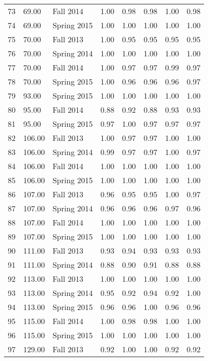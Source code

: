 \documentclass[12pt,]{article}
\begin{document}
\begin{longtable}{l|l|l|l|l|l|l|l}
  73 & 69.00 & Fall 2014 & 1.00 & 0.98 & 0.98 & 1.00 & 0.98 \\ 
  74 & 69.00 & Spring 2015 & 1.00 & 1.00 & 1.00 & 1.00 & 1.00 \\ 
  75 & 70.00 & Fall 2013 & 1.00 & 0.95 & 0.95 & 0.95 & 0.95 \\ 
  76 & 70.00 & Spring 2014 & 1.00 & 1.00 & 1.00 & 1.00 & 1.00 \\ 
  77 & 70.00 & Fall 2014 & 1.00 & 0.97 & 0.97 & 0.99 & 0.97 \\ 
  78 & 70.00 & Spring 2015 & 1.00 & 0.96 & 0.96 & 0.96 & 0.97 \\ 
  79 & 93.00 & Spring 2015 & 1.00 & 1.00 & 1.00 & 1.00 & 1.00 \\ 
  80 & 95.00 & Fall 2014 & 0.88 & 0.92 & 0.88 & 0.93 & 0.93 \\ 
  81 & 95.00 & Spring 2015 & 0.97 & 1.00 & 0.97 & 0.97 & 0.97 \\ 
  82 & 106.00 & Fall 2013 & 1.00 & 0.97 & 0.97 & 1.00 & 1.00 \\ 
  83 & 106.00 & Spring 2014 & 0.99 & 0.97 & 0.97 & 1.00 & 0.97 \\ 
  84 & 106.00 & Fall 2014 & 1.00 & 1.00 & 1.00 & 1.00 & 1.00 \\ 
  85 & 106.00 & Spring 2015 & 1.00 & 1.00 & 1.00 & 1.00 & 1.00 \\ 
  86 & 107.00 & Fall 2013 & 0.96 & 0.95 & 0.95 & 1.00 & 0.97 \\ 
  87 & 107.00 & Spring 2014 & 0.96 & 0.96 & 0.96 & 0.97 & 0.96 \\ 
  88 & 107.00 & Fall 2014 & 1.00 & 1.00 & 1.00 & 1.00 & 1.00 \\ 
  89 & 107.00 & Spring 2015 & 1.00 & 1.00 & 1.00 & 1.00 & 1.00 \\ 
  90 & 111.00 & Fall 2013 & 0.93 & 0.94 & 0.93 & 0.93 & 0.93 \\ 
  91 & 111.00 & Spring 2014 & 0.88 & 0.90 & 0.91 & 0.88 & 0.88 \\ 
  92 & 113.00 & Fall 2013 & 1.00 & 1.00 & 1.00 & 1.00 & 1.00 \\ 
  93 & 113.00 & Spring 2014 & 0.95 & 0.92 & 0.94 & 0.92 & 1.00 \\ 
  94 & 113.00 & Spring 2015 & 0.96 & 0.96 & 1.00 & 0.96 & 0.96 \\ 
  95 & 115.00 & Fall 2014 & 1.00 & 0.98 & 0.98 & 1.00 & 1.00 \\ 
  96 & 115.00 & Spring 2015 & 1.00 & 1.00 & 1.00 & 1.00 & 1.00 \\ 
  97 & 129.00 & Fall 2013 & 0.92 & 1.00 & 1.00 & 0.92 & 0.92 \\ 

\end{longtable}
\end{document}
